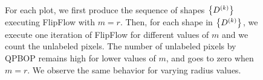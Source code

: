 \begin{figure}
\begin{minipage}[b]{0.5\textwidth}
\\%
%
\end{minipage}
\caption{For each plot, we first produce the sequence of shapes $\left\{ D^{(k)} \right\}$ executing FlipFlow with $m=r$. Then, for each shape in $\left\{ D^{(k)} \right\}$, we execute one iteration of FlipFlow for different values of $m$ and we count the unlabeled pixels. The number of unlabeled pixels by QPBOP remains high for lower values of $m$, and goes to zero when $m=r$. We observe the same behavior for varying radius values.}
\label{fig:unlabeled-versus-iterations}
\end{figure}



